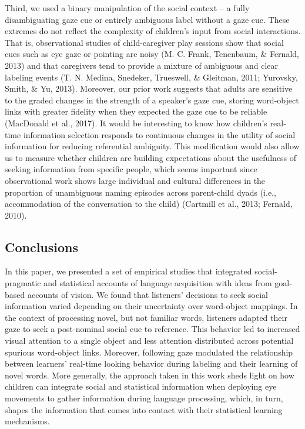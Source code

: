 \documentclass[man,floatsintext]{apa6}
\begin{document}
Third, we used a binary manipulation of the social context -- a fully
disambiguating gaze cue or entirely ambiguous label without a gaze cue.
These extremes do not reflect the complexity of children's input from
social interactions. That is, observational studies of child-caregiver
play sessions show that social cues such as eye gaze or pointing are
noisy (M. C. Frank, Tenenbaum, \& Fernald, 2013) and that caregivers
tend to provide a mixture of ambiguous and clear labeling events (T. N.
Medina, Snedeker, Trueswell, \& Gleitman, 2011; Yurovsky, Smith, \& Yu,
2013). Moreover, our prior work suggests that adults are sensitive to
the graded changes in the strength of a speaker's gaze cue, storing
word-object links with greater fidelity when they expected the gaze cue
to be reliable (MacDonald et al., 2017). It would be interesting to know
how children's real-time information selection responds to continuous
changes in the utility of social information for reducing referential
ambiguity. This modification would also allow us to measure whether
children are building expectations about the usefulness of seeking
information from specific people, which seems important since
observational work shows large individual and cultural differences in
the proportion of unambiguous naming episodes across parent-child dyads
(i.e., accommodation of the conversation to the child) (Cartmill et al.,
2013; Fernald, 2010).

\subsection{Conclusions}\label{conclusions}

In this paper, we presented a set of empirical studies that integrated
social-pragmatic and statistical accounts of language acquisition with
ideas from goal-based accounts of vision. We found that listeners'
decisions to seek social information varied depending on their
uncertainty over word-object mappings. In the context of processing
novel, but not familiar words, listeners adapted their gaze to seek a
post-nominal social cue to reference. This behavior led to increased
visual attention to a single object and less attention distributed
across potential spurious word-object links. Moreover, following gaze
modulated the relationship between learners' real-time looking behavior
during labeling and their learning of novel words. More generally, the
approach taken in this work sheds light on how children can integrate
social and statistical information when deploying eye movements to
gather information during language processing, which, in turn, shapes
the information that comes into contact with their statistical learning
mechanisms.
\end{document}
